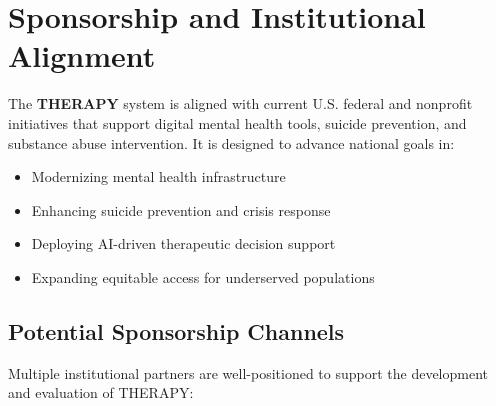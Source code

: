 \section*{Sponsorship and Institutional Alignment}

The \textbf{THERAPY} system is aligned with current U.S. federal and nonprofit initiatives that support digital mental health tools, suicide prevention, and substance abuse intervention. It is designed to advance national goals in:

\begin{itemize}
  \item Modernizing mental health infrastructure
  \item Enhancing suicide prevention and crisis response
  \item Deploying AI-driven therapeutic decision support
  \item Expanding equitable access for underserved populations
\end{itemize}

\subsection*{Potential Sponsorship Channels}

Multiple institutional partners are well-positioned to support the development and evaluation of THERAPY:

